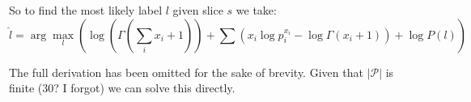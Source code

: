 \documentclass[12pt,a4paper,twoside,openright]{report}
\theoremstyle{definition}
\begin{document}
So to find the most likely label $l$ given slice $s$ we take:
\begin{equation}
  \hat{l} = \arg\max_l \left(\log \left(\Gamma\left(\sum\limits_{i} x_i + 1\right) \right) 
                +  \sum\limits \left( x_i \log p_i^{x_i} - \log \Gamma (x_i + 1) \right) 
                +  \log P(l) \right)
  \label{eq:loglabsol}
\end{equation}


The full derivation has been omitted for the sake of brevity. Given that $|\mathcal{P}|$ is finite ($30$? I forgot) we can solve this directly. 

\end{document}
